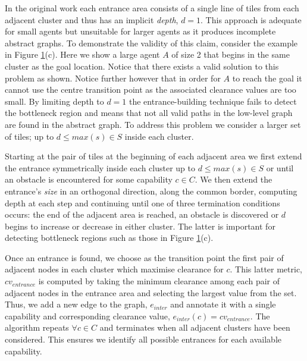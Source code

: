 {\begin{figure}[htbp]
\begin{center}
        \end{center}
        \label{aha-fig:clustersandentrances}
\end{figure}
\par \indent
In the original work each entrance area consists of a single line of tiles from each adjacent cluster and thus has an implicit \emph{depth}, $d = 1$.
This approach is adequate for small agents but unsuitable for larger agents as it produces incomplete abstract graphs. 
To demonstrate the validity of this claim, consider the example in Figure \ref{aha-fig:clustersandentrances}(c). 
Here we show a large agent $A$ of size 2 that begins in the same cluster as the goal location. 
Notice that there exists a valid solution to this problem as shown. 
Notice further however that in order for $A$ to reach the goal it cannot use the centre transition point as the associated clearance values are too small.
By limiting depth to $d = 1$ the entrance-building technique fails to detect the bottleneck region and means that not all valid paths in the low-level graph are found in the abstract graph.
To address this problem we consider a larger set of tiles; up to $d \leq max(s) \in S$  inside each cluster.
\par \indent
Starting at the pair of tiles at the beginning of each adjacent area we first extend the entrance symmetrically inside each cluster up to $d \leq max(s) \in S$ or until an obstacle is encountered for some capability $c \in C$.
We then extend the entrance's \emph{size} in an orthogonal direction, along the common border, computing depth at each step and continuing until one of three termination conditions occurs: the end of the adjacent area is reached, an obstacle is discovered or $d$ begins to increase or decrease in either cluster. 
The latter is important for detecting bottleneck regions such as those in Figure \ref{aha-fig:clustersandentrances}(c).
\par \indent
Once an entrance is found, we choose as the transition point the first pair of adjacent nodes in each cluster which maximise clearance for $c$.
This latter metric, $cv_{entrance}$ is computed by taking the minimum clearance among each pair of adjacent nodes in the entrance area and selecting the largest value from the set. 
Thus, we add a new edge to the graph, $e_{inter}$ and annotate it with a single capability and corresponding clearance value, $e_{inter}(c) = cv_{entrance}$. 
The algorithm repeats $\forall c \in C$ and terminates when all adjacent clusters have been considered. 
This ensures we identify all possible entrances for each available capability.
}
